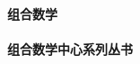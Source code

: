 \begin{titlepage}
\begin{center}
 \\
\vspace*{0.3cm}
\noindent {\LARGE \textbf{}} \\
\noindent \textbf{ } \\
\vspace*{0.5cm}
\noindent \Huge \textbf{组合数学} \\
\vspace*{0.3cm}
\noindent \large {} \\
\vspace*{0.3cm}
\noindent \LARGE \textbf{组合数学中心系列丛书} 
\end{center}
\end{titlepage}


